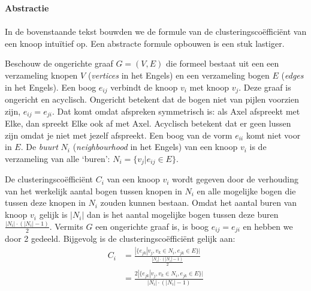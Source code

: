 \begin{kader}
\textbf{Abstractie}\\
\ \\
\noindent In de bovenstaande tekst bouwden we de formule van de clusteringscoëfficiënt van een knoop intuïtief op. Een abstracte formule opbouwen is een stuk lastiger. 

Beschouw de ongerichte graaf $G = (V, E)$ die formeel bestaat uit een een verzameling knopen $V$ (\textit{vertices} in het Engels) en een verzameling bogen $E$ (\textit{edges} in het Engels). Een boog $e_{ij}$ verbindt de knoop $v_i$ met knoop $v_j$. Deze graaf is ongericht en acyclisch. Ongericht betekent dat de bogen niet van pijlen voorzien zijn, $e_{ij} = e_{ji}$. Dat komt omdat afspreken symmetrisch is: als Axel afspreekt met Elke, dan spreekt Elke ook af met Axel. Acyclisch betekent dat er geen lussen zijn omdat je niet met jezelf afspreekt. Een boog van de vorm $e_{ii}$ komt niet voor in $E$. De \textit{buurt} $N_i$ (\textit{neighbourhood} in het Engels) van een knoop $v_i$ is de verzameling van alle `buren': $N_i = \{v_j | e_{ij} \in E\}.$

De clusteringscoëfficiënt $C_i$ van een knoop $v_i$ wordt gegeven door de verhouding van het werkelijk aantal bogen tussen knopen in $N_i$ en alle mogelijke bogen die tussen deze knopen in $N_i$ zouden kunnen bestaan. Omdat het aantal buren van knoop $v_i$ gelijk is $|N_i|$ dan is het aantal mogelijke bogen tussen deze buren $\frac{|N_i|\cdot\left(|N_i|-1\right)}{2}$. Vermits $G$ een ongerichte graaf is, is boog $e_{ij} = e_{ji}$ en hebben we door 2 gedeeld. Bijgevolg is de clusteringscoëfficiënt gelijk aan:
\begin{align*}
C_i &= \frac{|\{e_{jk} | v_j, v_k \in N_i, e_{jk} \in E\}|}{\frac{|N_i|\cdot\left(|N_i|-1\right)}{2}}\\
&= \frac{2|\{e_{jk} | v_j, v_k \in N_i, e_{jk} \in E\}|}{|N_i|\cdot\left(|N_i|-1\right)}
\end{align*}
\end{kader}


